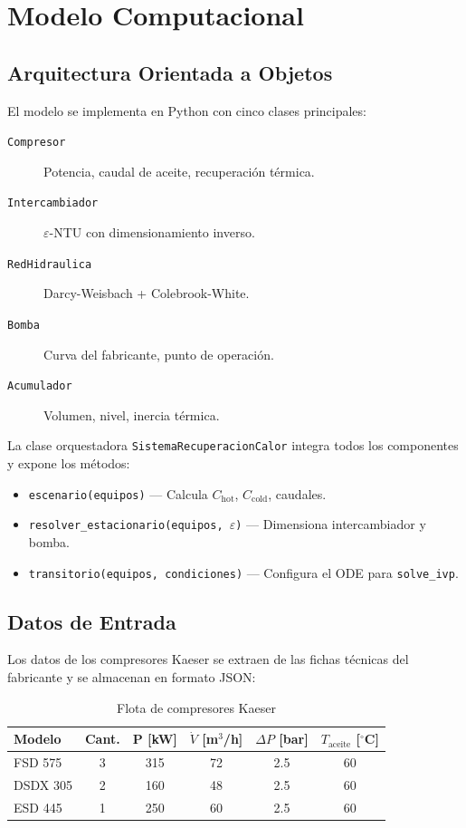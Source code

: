 \documentclass[11pt,a4paper]{report}
\begin{document}
\chapter{Modelo Computacional}

\section{Arquitectura Orientada a Objetos}

El modelo se implementa en Python con cinco clases principales:

\begin{description}
  \item[\texttt{Compresor}] Potencia, caudal de aceite, recuperación térmica.
  \item[\texttt{Intercambiador}] $\varepsilon$-NTU con dimensionamiento inverso.
  \item[\texttt{RedHidraulica}] Darcy-Weisbach + Colebrook-White.
  \item[\texttt{Bomba}] Curva del fabricante, punto de operación.
  \item[\texttt{Acumulador}] Volumen, nivel, inercia térmica.
\end{description}

La clase orquestadora \texttt{SistemaRecuperacionCalor} integra todos los componentes y expone los métodos:
\begin{itemize}
  \item \texttt{escenario(equipos)} — Calcula $C_{\text{hot}}$, $C_{\text{cold}}$, caudales.
  \item \texttt{resolver\_estacionario(equipos, $\varepsilon$)} — Dimensiona intercambiador y bomba.
  \item \texttt{transitorio(equipos, condiciones)} — Configura el ODE para \texttt{solve\_ivp}.
\end{itemize}

\section{Datos de Entrada}

Los datos de los compresores Kaeser se extraen de las fichas técnicas del fabricante y se almacenan en formato JSON:

\begin{table}[H]
\centering
\caption{Flota de compresores Kaeser}
\begin{tabular}{@{}lccccc@{}}
\toprule
\textbf{Modelo} & \textbf{Cant.} & \textbf{P [kW]} & \textbf{$\dot{V}$ [m$^3$/h]} & \textbf{$\Delta P$ [bar]} & \textbf{$T_{\text{aceite}}$ [$^\circ$C]} \\
\midrule
FSD 575 & 3 & 315 & 72 & 2.5 & 60 \\
DSDX 305 & 2 & 160 & 48 & 2.5 & 60 \\
ESD 445 & 1 & 250 & 60 & 2.5 & 60 \\
\bottomrule
\end{tabular}
\end{table}
\end{document}
